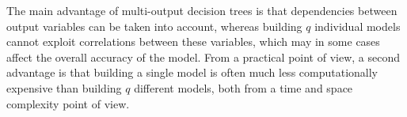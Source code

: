 The main advantage of multi-output decision trees is that dependencies between
output variables can be taken into account, whereas building $q$ individual
models cannot exploit correlations between these variables, which may in some
cases affect the overall accuracy of the model. From a practical point of view,
a second advantage is that building a single model is often much less
computationally expensive than building $q$ different models, both from a time
and space complexity point of view.
